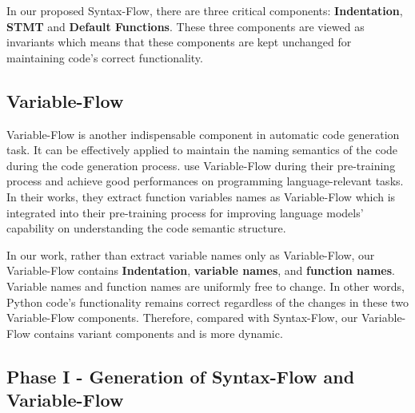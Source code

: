 \documentclass[11pt]{article}
\begin{document}
In our proposed Syntax-Flow, there are three critical components: \textbf{Indentation}, \textbf{STMT} and \textbf{Default Functions}. These three components are viewed as invariants which means that these components are kept unchanged for maintaining code's correct functionality.






\subsection{Variable-Flow} 

Variable-Flow is another indispensable component in automatic code generation task. It can be effectively applied to maintain the naming semantics of the code during the code generation process. \cite{wang2021codet5,guo2021graphcodebert} use Variable-Flow during their pre-training process and achieve good performances on programming language-relevant tasks. In their works, they extract function variables names as Variable-Flow which is integrated into their pre-training process for improving language models' capability on understanding the code semantic structure. 




In our work, rather than extract variable names only as Variable-Flow, our Variable-Flow contains \textbf{Indentation}, \textbf{variable names}, and \textbf{function names}. Variable names and function names are uniformly free to change. In other words, Python code's functionality remains correct regardless of the changes in these two Variable-Flow components. Therefore, compared with Syntax-Flow, our Variable-Flow contains variant components and is more dynamic. 












\subsection{Phase I - Generation of Syntax-Flow and Variable-Flow }
\end{document}
